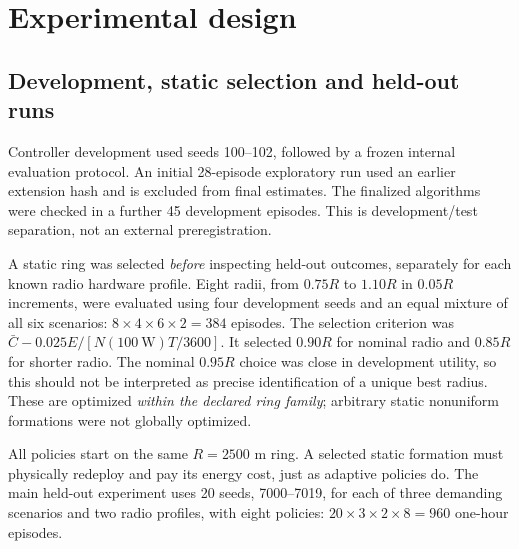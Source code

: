 \section{Experimental design}
\subsection{Development, static selection and held-out runs}
Controller development used seeds 100--102, followed by a frozen internal
evaluation protocol. An initial 28-episode exploratory run used an earlier
extension hash and is excluded from final estimates. The finalized algorithms
were checked in a further 45 development episodes. This is development/test
separation, not an external preregistration.

A static ring was selected \emph{before} inspecting held-out outcomes, separately
for each known radio hardware profile. Eight radii, from $0.75R$ to $1.10R$ in
$0.05R$ increments, were evaluated using four development seeds and an equal
mixture of all six scenarios: $8\times4\times6\times2=384$ episodes.
The selection criterion was
$\bar C-0.025E/[N(100~\mathrm W)T/3600]$.
It selected $0.90R$ for nominal radio and $0.85R$ for shorter radio.
The nominal $0.95R$ choice was close in development utility, so this should not
be interpreted as precise identification of a unique best radius.
These are optimized \emph{within the declared ring family}; arbitrary static
nonuniform formations were not globally optimized.

All policies start on the same $R=2500$ m ring. A selected static formation must
physically redeploy and pay its energy cost, just as adaptive policies do.
The main held-out experiment uses 20 seeds, 7000--7019, for each of three
demanding scenarios and two radio profiles, with eight policies:
$20\times3\times2\times8=960$ one-hour episodes.

